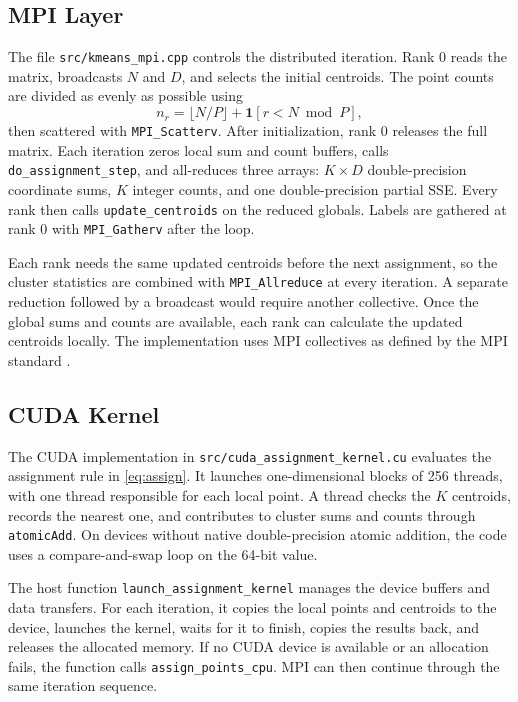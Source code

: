 \documentclass[conference]{IEEEtran}
\DeclareRobustCommand{\code}[1]{\texttt{#1}}
\DeclareRobustCommand{\file}[1]{\texttt{#1}}
\begin{document}
\subsection{MPI Layer}

The file \file{src/kmeans\_mpi.cpp} controls the distributed iteration. Rank 0 reads the matrix, broadcasts $N$ and $D$, and selects the initial centroids. The point counts are divided as evenly as possible using
\begin{equation}
  n_r = \big\lfloor N/P \big\rfloor + \mathbf{1}[r < N \bmod P],
  \label{eq:partition}
\end{equation}
then scattered with \code{MPI\_Scatterv}. After initialization, rank 0 releases the full matrix. Each iteration zeros local sum and count buffers, calls \code{do\_assignment\_step}, and all-reduces three arrays: $K \times D$ double-precision coordinate sums, $K$ integer counts, and one double-precision partial SSE. Every rank then calls \code{update\_centroids} on the reduced globals. Labels are gathered at rank 0 with \code{MPI\_Gatherv} after the loop.

Each rank needs the same updated centroids before the next assignment, so the cluster statistics are combined with \code{MPI\_Allreduce} at every iteration. A separate reduction followed by a broadcast would require another collective. Once the global sums and counts are available, each rank can calculate the updated centroids locally. The implementation uses MPI collectives as defined by the MPI standard \cite{mpi40}.

\subsection{CUDA Kernel}

The CUDA implementation in \file{src/cuda\_assignment\_kernel.cu} evaluates the assignment rule in \eqref{eq:assign}. It launches one-dimensional blocks of 256 threads, with one thread responsible for each local point. A thread checks the $K$ centroids, records the nearest one, and contributes to cluster sums and counts through \code{atomicAdd}. On devices without native double-precision atomic addition, the code uses a compare-and-swap loop on the 64-bit value.

The host function \code{launch\_assignment\_kernel} manages the device buffers and data transfers. For each iteration, it copies the local points and centroids to the device, launches the kernel, waits for it to finish, copies the results back, and releases the allocated memory. If no CUDA device is available or an allocation fails, the function calls \code{assign\_points\_cpu}. MPI can then continue through the same iteration sequence.
\end{document}
